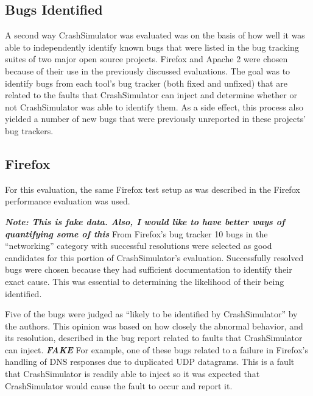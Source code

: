     \subsection{Bugs Identified}

        A second way CrashSimulator was evaluated was on the basis of how well it was able to independently identify
        known bugs that were listed in the bug tracking suites of two major open source projects. Firefox and Apache 2
        were chosen because of their use in the previously discussed evaluations. The goal was to identify bugs from
        each tool's bug tracker (both fixed and unfixed) that are related to the faults that CrashSimulator can inject
        and determine whether or not CrashSimulator was able to identify them. As a side effect, this process also
        yielded a number of new bugs that were previously unreported in these projects' bug trackers.

        \subsection{Firefox}

            For this evaluation, the same Firefox test setup as was described in the Firefox performance evaluation was
            used.

            \textbf{\emph{Note: This is fake data. Also, I would like to have better ways of quantifying some of this}}
            From Firefox's bug tracker 10 bugs in the ``networking'' category with successful resolutions were selected
            as good candidates for this portion of CrashSimulator's evaluation. Successfully resolved bugs were chosen
            because they had sufficient documentation to identify their exact cause. This was essential to determining
            the likelihood of their being identified.

            Five of the bugs were judged as ``likely to be identified by CrashSimulator'' by the authors. This opinion
            was based on how closely the abnormal behavior, and its resolution, described in the bug report related to
            faults that CrashSimulator can inject. \textbf{\emph{FAKE}} For example, one of these bugs related to a
            failure in Firefox's handling of DNS responses due to duplicated UDP datagrams. This is a fault that
            CrashSimulator is readily able to inject so it was expected that CrashSimulator would cause the fault to
            occur and report it.

